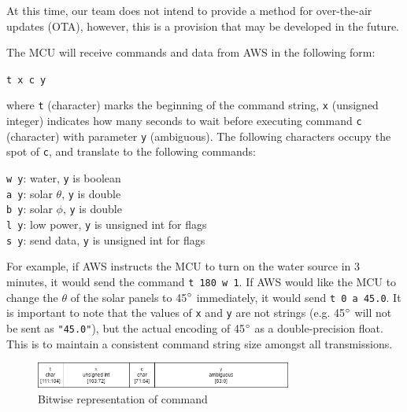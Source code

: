 \begin{flushleft}
    At this time, our team does not intend to provide a method for over-the-air
    updates (OTA), however, this is a provision that may be developed in the
    future.
\end{flushleft}
\begin{flushleft}
    The MCU will receive commands and data from AWS in the following form:
    \begin{center}
        \texttt{t x c y}
    \end{center}
    where \texttt{t} (character) marks the beginning of the command string,
    \texttt{x} (unsigned integer) indicates how many seconds to wait before
    executing command \texttt{c} (character) with parameter \texttt{y}
    (ambiguous). The following characters occupy the spot of \texttt{c}, and
    translate to the following commands:
    \begin{center}
        \texttt{w y}: water, \texttt{y} is boolean \\
        \texttt{a y}: solar $\theta$, \texttt{y} is double \\
        \texttt{b y}: solar $\phi$, \texttt{y} is double \\
        \texttt{l y}: low power, \texttt{y} is unsigned int for flags \\
        \texttt{s y}: send data, \texttt{y} is unsigned int for flags
    \end{center}
    For example, if AWS instructs the MCU to turn on the water source in 3
    minutes, it would send the command \texttt{t 180 w 1}. If AWS would like
    the MCU to change the $\theta$ of the solar panels to 45$\degree$
    immediately, it would send \texttt{t 0 a 45.0}. It is important to note
    that the values of \texttt{x} and \texttt{y} are not strings (e.g.
    45$\degree$ will not be sent as \texttt{"45.0"}), but the actual encoding
    of 45$\degree$ as a double-precision float. This is to maintain a
    consistent command string size amongst all transmissions.
    \begin{figure}[H]
        \label{command_bitwise}
        \caption{Bitwise representation of command}
        \centering
        \includegraphics[width=0.75\textwidth]{images/command_encoding.png}
    \end{figure}
\end{flushleft}
